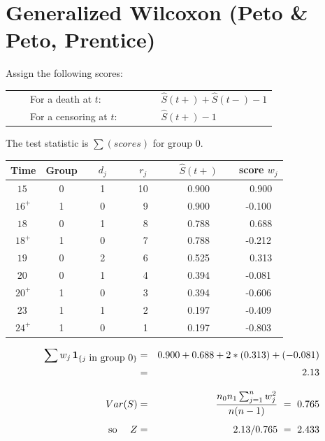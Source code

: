 \documentclass[11pt,slidesonly,semrot,portrait,palatino]{book}
\begin{document}
{\section{Generalized Wilcoxon (Peto \& Peto, Prentice)}
Assign the following scores:\\
\begin{tabular}{ll}
~~~~For a death at $t$: &             $\hat{S}(t+) + \hat{S}(t-) -1$\\
~~~~For a censoring at $t$:~~~~~~~  & $\hat{S}(t+) - 1$
\end{tabular}
The test statistic is $\sum(scores)$  for group 0.
\begin{center}
\begin{tabular}{cccccc}
\hline
Time & Group & ~~$d_j$~~ & ~~$r_j$~~ & ~~$\hat{S}(t+)$~~ & score $w_j$\\ \hline
$15~$     &     0   &   1   &   10      & 0.900 & ~0.900 \\
$16^+$    &     1   &   0   &   ~9  & 0.900 & -0.100 \\
$18~$     &     0   &   1   &   ~8  & 0.788 & ~0.688 \\
$18^+$    &     1   &   0   &   ~7  & 0.788 & -0.212 \\
$19~$     &     0   &   2   &   ~6  & 0.525 & ~0.313 \\
$20~$     &     0   &   1   &   ~4  & 0.394 & -0.081 \\
$20^+$    &     1   &   0   &   ~3  & 0.394 & -0.606 \\
$23~$     &     1   &   1   &   ~2  & 0.197 & -0.409 \\
$24^+$    &     1   &   0   &   ~1  & 0.197 & -0.803 \\ \hline
\end{tabular}
\end{center}
\begin{eqnarray*}
\sum w_j \, {\bf 1}_{\{j \mbox{ in group 0}\}}
& = & 0.900 + 0.688 + 2*(0.313) + (-0.081) \\
& = & 2.13\\[2ex]
Var(S) & = & \frac{n_0 n_1 \sum_{j=1}^{n} w_j^2 }{n(n-1)} ~=~ 0.765\\[1ex]
\mbox{so}~~~~ Z & = & 2.13/0.765 ~=~ 2.433
\end{eqnarray*}
}
\end{document}
